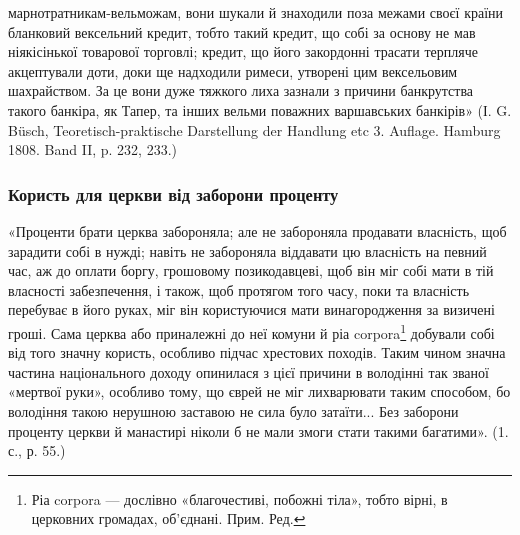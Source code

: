\parcont{}  %
марнотратникам-вельможам, вони шукали й знаходили поза межами своєї країни
бланковий вексельний кредит, тобто такий кредит, що собі за основу не мав
ніякісінької товарової торговлі; кредит, що його закордонні трасати терпляче
акцептували доти, доки ще надходили римеси, утворені цим вексельовим шахрайством.
За це вони дуже тяжкого лиха зазнали з причини банкрутства такого
банкіра, як Тапер, та інших вельми поважних варшавських банкірів» (І. G. Büsch,
Teoretisch-praktische Darstellung der Handlung etc 3. Auflage. Hamburg 1808. Band
II, p. 232, 233.)

\subsubsection{Користь для церкви від заборони проценту}

«Проценти брати церква забороняла; але не забороняла продавати власність,
щоб зарадити собі в нужді; навіть не забороняла віддавати цю власність
на певний час, аж до оплати боргу, грошовому позикодавцеві, щоб він міг собі
мати в тій власності забезпечення, і також, щоб протягом того часу, поки та
власність перебуває в його руках, міг він користуючися мати винагородження
за визичені гроші. Сама церква або приналежні до неї комуни й ріа corpora\footnote*{
Ріа corpora — дослівно «благочестиві, побожні тіла», тобто вірні, в церковних громадах,
об’єднані. Прим. Ред.
} добували
собі від того значну користь, особливо підчас хрестових походів. Таким
чином значна частина національного доходу опинилася з цієї причини в володінні
так званої «мертвої руки», особливо тому, що єврей не міг лихварювати таким
способом, бо володіння такою нерушною заставою не сила було затаїти... Без
заборони проценту церкви й манастирі ніколи б не мали змоги стати такими
багатими». (1. с., р. 55.)
\parbreak{}  %

